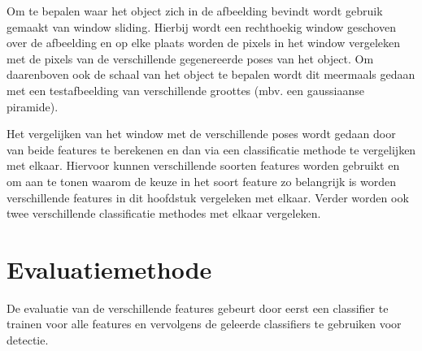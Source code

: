 Om te bepalen waar het object zich in de afbeelding bevindt wordt gebruik gemaakt van window sliding. Hierbij wordt een rechthoekig window geschoven over de afbeelding en op elke plaats worden de pixels in het window vergeleken met de pixels van de verschillende gegenereerde poses van het object. Om daarenboven ook de schaal van het object te bepalen wordt dit meermaals gedaan met een testafbeelding van verschillende groottes (mbv. een gaussiaanse piramide).

Het vergelijken van het window met de verschillende poses wordt gedaan door van beide features te berekenen en dan via een classificatie methode te vergelijken met elkaar. Hiervoor kunnen verschillende soorten features worden gebruikt en om aan te tonen waarom de keuze in het soort feature zo belangrijk is worden verschillende features in dit hoofdstuk vergeleken met elkaar. Verder worden ook twee verschillende classificatie methodes met elkaar vergeleken.

\section{Evaluatiemethode} \label{sec:eval_hfdst4}
De evaluatie van de verschillende features gebeurt door eerst een classifier te trainen voor alle features en vervolgens de geleerde classifiers te gebruiken voor detectie. 

